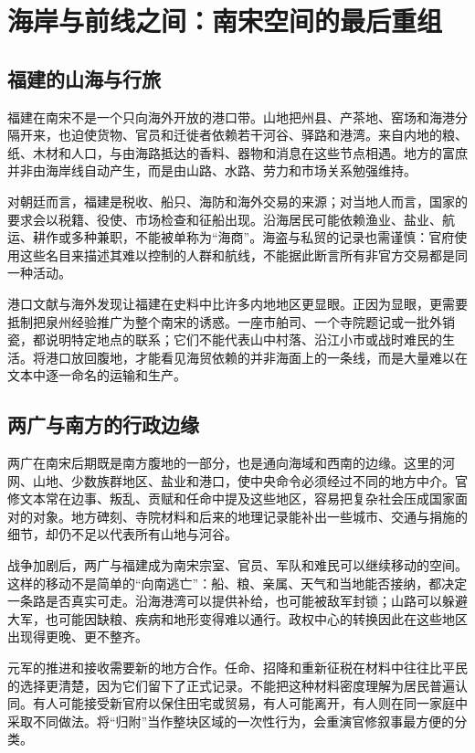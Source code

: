 \section{海岸与前线之间：南宋空间的最后重组}

\subsection{福建的山海与行旅}

福建在南宋不是一个只向海外开放的港口带。山地把州县、产茶地、窑场和海港分隔开来，也迫使货物、官员和迁徙者依赖若干河谷、驿路和港湾。来自内地的粮、纸、木材和人口，与由海路抵达的香料、器物和消息在这些节点相遇。地方的富庶并非由海岸线自动产生，而是由山路、水路、劳力和市场关系勉强维持。

对朝廷而言，福建是税收、船只、海防和海外交易的来源；对当地人而言，国家的要求会以税籍、役使、市场检查和征船出现。沿海居民可能依赖渔业、盐业、航运、耕作或多种兼职，不能被单称为“海商”。海盗与私贸的记录也需谨慎：官府使用这些名目来描述其难以控制的人群和航线，不能据此断言所有非官方交易都是同一种活动。

港口文献与海外发现让福建在史料中比许多内地地区更显眼。正因为显眼，更需要抵制把泉州经验推广为整个南宋的诱惑。一座市舶司、一个寺院题记或一批外销瓷，都说明特定地点的联系；它们不能代表山中村落、沿江小市或战时难民的生活。将港口放回腹地，才能看见海贸依赖的并非海面上的一条线，而是大量难以在文本中逐一命名的运输和生产。

\subsection{两广与南方的行政边缘}

两广在南宋后期既是南方腹地的一部分，也是通向海域和西南的边缘。这里的河网、山地、少数族群地区、盐业和港口，使中央命令必须经过不同的地方中介。官修文本常在边事、叛乱、贡赋和任命中提及这些地区，容易把复杂社会压成国家面对的对象。地方碑刻、寺院材料和后来的地理记录能补出一些城市、交通与捐施的细节，却仍不足以代表所有山地与河谷。

战争加剧后，两广与福建成为南宋宗室、官员、军队和难民可以继续移动的空间。这样的移动不是简单的“向南逃亡”：船、粮、亲属、天气和当地能否接纳，都决定一条路是否真实可走。沿海港湾可以提供补给，也可能被敌军封锁；山路可以躲避大军，也可能因缺粮、疾病和地形变得难以通行。政权中心的转换因此在这些地区出现得更晚、更不整齐。

元军的推进和接收需要新的地方合作。任命、招降和重新征税在材料中往往比平民的选择更清楚，因为它们留下了正式记录。不能把这种材料密度理解为居民普遍认同。有人可能接受新官府以保住田宅或贸易，有人可能离开，有人则在同一家庭中采取不同做法。将“归附”当作整块区域的一次性行为，会重演官修叙事最方便的分类。

